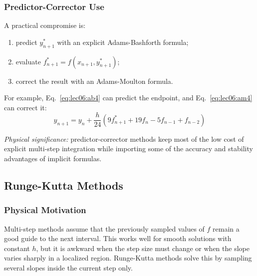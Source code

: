 \subsubsection{Predictor-Corrector Use}
A practical compromise is:
\begin{enumerate}
    \item predict $y_{n+1}^{*}$ with an explicit Adams-Bashforth formula;
    \item evaluate $f_{n+1}^{*}=f(x_{n+1},y_{n+1}^{*})$;
    \item correct the result with an Adams-Moulton formula.
\end{enumerate}
For example, Eq.~\eqref{eq:lec06:ab4} can predict the endpoint, and
Eq.~\eqref{eq:lec06:am4} can correct it:
\begin{equation}
    \boxed{
    y_{n+1}
    =y_n+\frac{h}{24}
    \left(9f_{n+1}^{*}+19f_n-5f_{n-1}+f_{n-2}\right)}
    \label{eq:lec06:predictor-corrector}
\end{equation}

\textit{Physical significance:} predictor-corrector methods keep most of the
low cost of explicit multi-step integration while importing some of the
accuracy and stability advantages of implicit formulas.

\subsection{Runge-Kutta Methods}\label{subsec:lec06:runge-kutta}

\subsubsection*{Physical Motivation}
Multi-step methods assume that the previously sampled values of $f$ remain a
good guide to the next interval. This works well for smooth solutions with
constant $h$, but it is awkward when the step size must change or when the
slope varies sharply in a localized region. Runge-Kutta methods solve this by
sampling several slopes inside the current step only.

